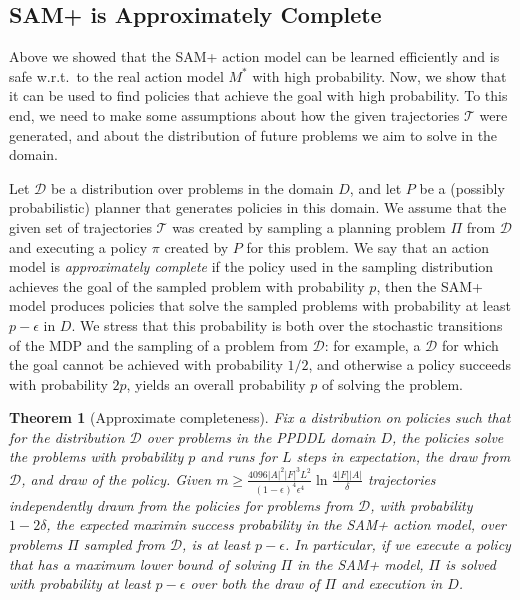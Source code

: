 \documentclass[letterpaper]{article} %
\newtheorem{theorem}{Theorem}
\begin{document}
\subsection{SAM+ is Approximately Complete}

Above we showed that the SAM+ action model can be learned efficiently and is safe w.r.t.\ to the real action model $M^*$ with high probability. 
Now, we show that it can be used to find policies that achieve the goal with high probability. 
To this end, we need to make some assumptions about how the given trajectories $\mathcal{T}$ were generated, and about the distribution of future problems we aim to solve in the domain. 


Let $\mathcal{D}$ be a distribution over problems in the domain $D$, 
and let $P$ be a (possibly probabilistic) planner that generates policies in this domain. 
We assume that the given set of trajectories $\mathcal{T}$ was created by sampling a planning problem $\Pi$ from $\mathcal{D}$ and executing a policy $\pi$ created by $P$ for this problem. %
We say that an action model is \emph{approximately complete} if the policy used in the sampling distribution achieves the goal of the sampled problem with probability $p$, then the SAM+ model produces policies that solve the sampled problems with probability at least $p-\epsilon$ in $D$.
We stress that this probability is both over the stochastic transitions of the MDP and the sampling of a problem from $\mathcal{D}$: for example, a $\mathcal{D}$ for which the goal cannot be achieved with probability $1/2$, and otherwise a policy succeeds with probability $2p$, yields an overall probability $p$ of solving the problem.

\begin{theorem}[Approximate completeness]
\label{thm:sam-ac}
Fix a distribution on policies such that for the distribution $\mathcal{D}$ over problems 
in the PPDDL domain $D$, the policies solve the problems with probability $p$ and runs for $L$ steps in expectation, the draw from $\mathcal{D}$, and draw of the policy.
Given 
$
m\geq \frac{4096|A|^2|F|^3L^2}{(1-\epsilon)^4\epsilon^4}\ln\frac{4|F||A|}{\delta}
$
trajectories independently drawn from the policies for problems from $\mathcal{D}$, 
with probability $1-2\delta$, the expected maximin success probability in the SAM+ action model, over problems $\Pi$ sampled from $\mathcal{D}$, is at least $p-\epsilon$. In particular, if we execute a policy that has a maximum lower bound of solving $\Pi$ in the SAM+ model, 
$\Pi$ is solved with probability at least $p-\epsilon$ over both the draw of $\Pi$ and execution in $D$.
\end{theorem}
\end{document}
